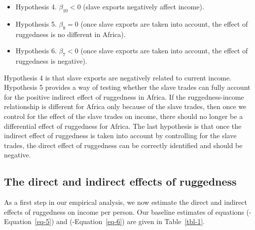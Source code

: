 \documentclass[
  letterpaper,
  DIV=11,
  numbers=noendperiod]{scrartcl}
\providecommand{\tightlist}{%
  \setlength{\itemsep}{0pt}\setlength{\parskip}{0pt}}\usepackage{longtable,booktabs,array}
\begin{document}
\begin{itemize}
\tightlist
\item
  Hypothesis 4. \(\beta_{10} < 0\) (slave exports negatively affect
  income).
\item
  Hypothesis 5. \(\beta_8 = 0\) (once slave exports are taken into
  account, the effect of ruggedness is no different in Africa).
\item
  Hypothesis 6. \(\beta_7 < 0\) (once slave exports are taken into
  account, the effect of ruggedness is negative).
\end{itemize}

Hypothesis 4 is that slave exports are negatively related to current
income. Hypothesis 5 provides a way of testing whether the slave trades
can fully account for the positive indirect effect of ruggedness in
Africa. If the ruggedness-income relationship is different for Africa
only because of the slave trades, then once we control for the effect of
the slave trades on income, there should no longer be a differential
effect of ruggedness for Africa. The last hypothesis is that once the
indirect effect of ruggedness is taken into account by controlling for
the slave trades, the direct effect of ruggedness can be correctly
identified and should be negative.

\subsection{The direct and indirect effects of ruggedness}\label{sec-4}

As a first step in our empirical analysis, we now estimate the direct
and indirect effects of ruggedness on income per person. Our baseline
estimates of equations (-Equation~\ref{eq-5}) and (-Equation~\ref{eq-6})
are given in Table~\ref{tbl-1}.
\end{document}
